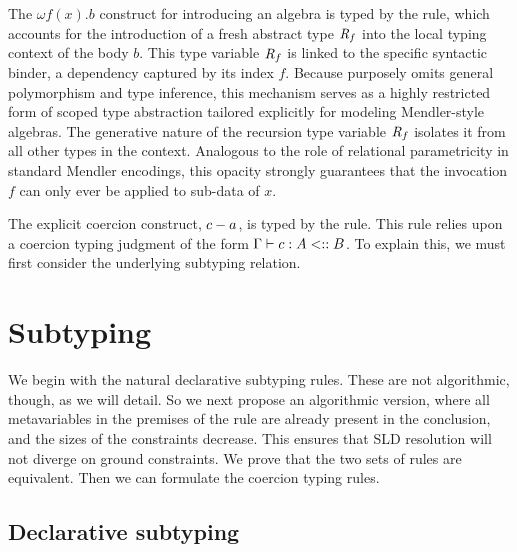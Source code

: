 \documentclass[pdflatex,sn-mathphys-num]{sn-jnl}%
\theoremstyle{thmstyleone}%
\theoremstyle{thmstyletwo}%
\theoremstyle{thmstylethree}%
\begin{document}
The $\omega f(x) . b$ construct for introducing an algebra is typed by the  rule, which accounts for the introduction of a fresh abstract type $\textit{R}_{f}$ into the local typing context of the body $b$.
This type variable $\textit{R}_{f}$ is linked to the specific syntactic binder, a dependency captured by its index $f$.
Because \lcata purposely omits general polymorphism and type inference, this mechanism serves as a highly restricted form of scoped type abstraction tailored explicitly for modeling Mendler-style algebras.
The generative nature of the recursion type variable $\textit{R}_{f}$ isolates it from all other types in the context.
Analogous to the role of relational parametricity in standard Mendler encodings, this opacity strongly guarantees that the invocation $f$ can only ever be applied to sub-data of $x$.

The explicit coercion construct, $c - a$, is typed by the  rule.
This rule relies upon a coercion typing judgment of the form $\Gamma \vdash c : A \mathrel{<::} B$.  To explain this,
we must first consider the underlying subtyping relation.

\section{Subtyping} %
\label{sec:subtyping}

We begin with the natural declarative subtyping rules.  These are not
algorithmic, though, as we will detail.  So we next propose an
algorithmic version, where all metavariables in the premises of the
rule are already present in the conclusion, and the sizes of the
constraints decrease.  This ensures that SLD resolution will not
diverge on ground constraints.  We prove that the two sets of rules
are equivalent.  Then we can formulate the coercion typing rules.

\subsection{Declarative subtyping}

\newcommand{\declcata}[1]{
  \inferrule[#1]{ }{
    D \sAlg A \subtype \sMu{D} \sArr A
}}
\end{document}
